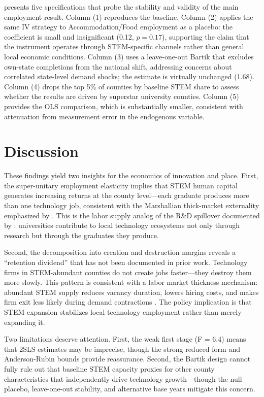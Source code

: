 \documentclass[12pt]{article}
\begin{document}


 presents five specifications that probe the stability and validity of the main employment result. Column (1) reproduces the baseline. Column (2) applies the same IV strategy to Accommodation/Food employment as a placebo: the coefficient is small and insignificant (0.12, $p = 0.17$), supporting the claim that the instrument operates through STEM-specific channels rather than general local economic conditions. Column (3) uses a leave-one-out Bartik that excludes own-state completions from the national shift, addressing concerns about correlated state-level demand shocks; the estimate is virtually unchanged (1.68). Column (4) drops the top 5\% of counties by baseline STEM share to assess whether the results are driven by superstar university counties. Column (5) provides the OLS comparison, which is substantially smaller, consistent with attenuation from measurement error in the endogenous variable.

\section{Discussion}

These findings yield two insights for the economics of innovation and place. First, the super-unitary employment elasticity implies that STEM human capital generates increasing returns at the county level---each graduate produces more than one technology job, consistent with the Marshallian thick-market externality emphasized by \citet{moretti2010local}. This is the labor supply analog of the R\&D spillover documented by \citet{hausman2022university}: universities contribute to local technology ecosystems not only through research but through the graduates they produce.

Second, the decomposition into creation and destruction margins reveals a ``retention dividend'' that has not been documented in prior work. Technology firms in STEM-abundant counties do not create jobs faster---they destroy them more slowly. This pattern is consistent with a labor market thickness mechanism: abundant STEM supply reduces vacancy duration, lowers hiring costs, and makes firm exit less likely during demand contractions \citep{decker2014role}. The policy implication is that STEM expansion stabilizes local technology employment rather than merely expanding it.

Two limitations deserve attention. First, the weak first stage (F = 6.4) means that 2SLS estimates may be imprecise, though the strong reduced form and Anderson-Rubin bounds provide reassurance. Second, the Bartik design cannot fully rule out that baseline STEM capacity proxies for other county characteristics that independently drive technology growth---though the null placebo, leave-one-out stability, and alternative base years mitigate this concern.
\end{document}
